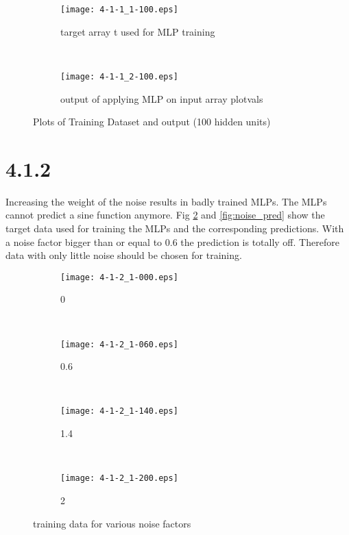 \documentclass[a4paper,11pt]{article}
\theoremstyle{definition}
\theoremstyle{plain}
\theoremstyle{remark}
\begin{document}
\begin{figure}
\begin{subfigure}[b]{0.45\textwidth}
\centering
\texttt{[image: 4-1-1\_1-100.eps]}
\caption{target array t used for MLP training}
\end{subfigure}
~
\begin{subfigure}[b]{0.45\textwidth}
\centering
\texttt{[image: 4-1-1\_2-100.eps]}
\caption{output of applying MLP on input array plotvals}
\end{subfigure}

\centering
\caption{Plots of Training Dataset and output (100 hidden units)}
\label{fig:MLP-100}
\end{figure}

\clearpage
\section*{4.1.2}

Increasing the weight of the noise results in badly trained MLPs. The MLPs cannot predict a sine function anymore. Fig \ref{fig:noise_train} and \ref{fig:noise_pred} show the target data used for training the MLPs and the corresponding predictions. With a noise factor bigger than or equal to 0.6 the prediction is totally off. Therefore data with only little noise should be chosen for training.

\begin{figure}
\centering
\begin{subfigure}[b]{0.23\textwidth}
\centering
\texttt{[image: 4-1-2\_1-000.eps]}
\caption{0}
\end{subfigure}
~
\begin{subfigure}[b]{0.23\textwidth}
\centering
\texttt{[image: 4-1-2\_1-060.eps]}
\caption{0.6}
\end{subfigure}
~
\begin{subfigure}[b]{0.23\textwidth}
\centering
\texttt{[image: 4-1-2\_1-140.eps]}
\caption{1.4}
\end{subfigure}
~
\begin{subfigure}[b]{0.23\textwidth}
\centering
\texttt{[image: 4-1-2\_1-200.eps]}
\caption{2}
\end{subfigure}


\caption{training data for various noise factors}
\label{fig:noise_train}
\end{figure}
\end{document}
